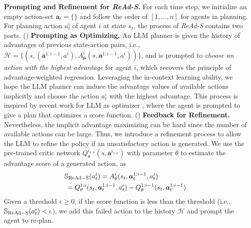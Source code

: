 \documentclass[11pt]{article}
\theoremstyle{plain}
\theoremstyle{remark}
\begin{document}
\textbf{Prompting and Refinement for \emph{ReAd-S}.}
For each time step, we initialize an empty action-set $\boldsymbol{a}_t = \{\}$ and follow the order of $[1,\ldots,n]$ for agents in planning.
For planning action $a^i_t$ of agent $i$ at state $s_t$, 
the process of \emph{ReAd-S} contains two parts. () \textbf{Prompting as Optimizing.} An LLM planner is given the history of advantages of previous state-action pairs, i.e., $\mathcal{H}=\{(s,(\boldsymbol{a}^{1:i-1},a^i),A_{\boldsymbol{\mu}}^{i}(s,\boldsymbol{a}^{1:i-1}, a^i))\}$, and is prompted to \emph{choose an action with the highest advantage} for agent $i$, which recovers the principle of advantage-weighted regression. Leveraging the in-context learning ability, we hope the LLM planner can induce the advantage values of available actions 
implicitly and choose the action $a^i_t$ with the highest advantage. This process is inspired by recent work for LLM as optimizer \citep{yang2023OPRO}, where the agent is prompted to give a plan that optimizes a score function. 
() \textbf{Feedback for Refinement.} Nevertheless, the implicit advantage maximizing can be hard since the number of available actions can be large. Thus, we introduce a refinement process to allow the LLM to refine the policy if an unsatisfactory action 
is generated. We use the pre-trained critic network $Q_{\theta}^{i_{1:u}}(s, \boldsymbol{a}^{i_{1:u}})$ with parameter $\theta$ to estimate the advantage score of a generated action, as
\begin{align*}
&\mathbb{S}_{\rm ReAd-S}(a^i_t) = A_{\theta}^{i}(s_t, \boldsymbol{a}_t^{1:i-1}, a_{t}^{i}) \\
&\, = Q_{\theta}^{1:i}(s_t, \boldsymbol{a}^{1:i-1}_t, a_{t}^{i}) - Q_{\theta}^{1:i-1}(s_t, \boldsymbol{a}^{1:i-1}_t).
\end{align*}
Given a threshold $\epsilon \geq 0$, if the score function is less than the threshold (i.e., $\mathbb{S}_{\rm ReAd-S}(a^i_t)<\epsilon$), we add this failed action to the history $\mathcal{H}$ and prompt the agent to re-plan.
\end{document}
